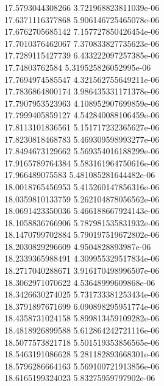 {17.5793044308266 3.721968823811039e-06 \\
17.6371116377868 5.906146725465078e-06 \\
17.6762705685142 7.157727850426454e-06 \\
17.7010376462067 7.370833827735623e-06 \\
17.7289115427739 6.433222097257385e-06 \\
17.74803762584 5.319525826052995e-06 \\
17.7694974585547 4.321562755649211e-06 \\
17.7836864800174 3.986435331171378e-06 \\
17.7907953523963 4.108952907699859e-06 \\
17.7999405859127 4.542840088106459e-06 \\
17.8113101836561 5.151717232365627e-06 \\
17.8230818468783 5.469309598993277e-06 \\
17.8494673129662 5.569354016188299e-06 \\
17.9165789764384 5.583161964750616e-06 \\
17.966489075583 5.481085281644482e-06 \\
18.0018765456953 5.415260147856316e-06 \\
18.0359810133759 5.262104878056562e-06 \\
18.0691423350036 5.466188667924143e-06 \\
18.1058836766906 5.787981535831932e-06 \\
18.1470799702884 5.790197519672802e-06 \\
18.2030829296609 4.9504828893987e-06 \\
18.2339365988491 4.309955329517834e-06 \\
18.2717040288671 3.916170498996507e-06 \\
18.3062971070622 4.53648999609868e-06 \\
18.3426630274025 5.731733381253434e-06 \\
18.3791897671699 6.090898295951774e-06 \\
18.4358731024158 5.899813459109282e-06 \\
18.4818926899588 5.612864242721116e-06 \\
18.5077573821718 5.501519353856565e-06 \\
18.5463191086628 5.281182893668301e-06 \\
18.5796286664163 5.569100721913856e-06 \\
18.6165199324023 5.83275959797902e-06 \\
}
